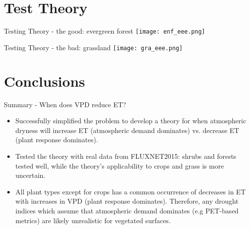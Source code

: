 \documentclass{beamer}
\begin{document}
\section{Test Theory}
\begin{frame}{Testing Theory - the good: evergreen forest}
  \texttt{[image: enf\_eee.png]}
\end{frame}

\begin{frame}{Testing Theory - the bad: grassland}
  \texttt{[image: gra\_eee.png]}
\end{frame}

\section{Conclusions}

\begin{frame}{Summary - When does VPD reduce ET?}
  \small
  \begin{itemize}
  \item Successfully simplified the problem to develop a theory for when atmospheric dryness will increase ET (atmospheric demand dominates) vs. decrease ET (plant response dominates).
  \item Tested the theory with real data from FLUXNET2015: shrubs and forests tested well, while the theory's applicability to crops and grass is more uncertain.
  \item All plant types except for crops has a common occurrence of decreases in ET with increases in VPD (plant response dominates). Therefore, any drought indices which assume that atmospheric demand dominates (e.g PET-based metrics) are likely unrealistic for vegetated surfaces.
  \end{itemize}
\end{frame}
\end{document}
